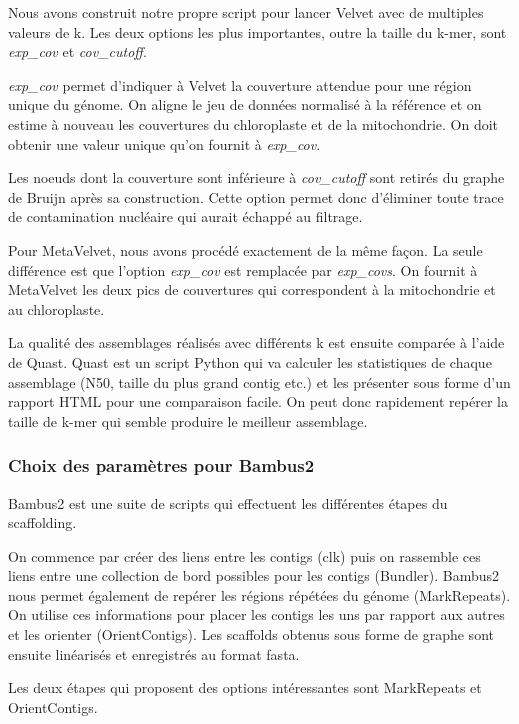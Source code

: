 \documentclass[a4paper]{article}
\begin{document}
Nous avons construit notre propre script pour lancer Velvet avec de multiples valeurs de k. Les deux options les plus importantes, outre la taille du k-mer, sont  \textit{exp\_cov} et \textit{cov\_cutoff}. 

\textit{exp\_cov} permet d'indiquer à Velvet la couverture attendue pour une région unique du génome. On aligne le jeu de données normalisé à la référence et on estime à nouveau les couvertures du chloroplaste et de la mitochondrie. On doit obtenir une valeur unique qu'on fournit à \textit{exp\_cov}. 

Les noeuds dont la couverture sont inférieure à \textit{cov\_cutoff} sont retirés du graphe de Bruijn après sa construction. Cette option permet donc d'éliminer toute trace de contamination nucléaire qui aurait échappé au filtrage.  

Pour MetaVelvet, nous avons procédé exactement de la même façon. La seule différence est que l'option \textit{exp\_cov} est remplacée par \textit{exp\_covs}. On fournit à MetaVelvet les deux pics de couvertures qui correspondent à la mitochondrie et au chloroplaste.

La qualité des assemblages réalisés avec différents k est ensuite comparée à l'aide de Quast. Quast est un script Python qui va calculer les statistiques de chaque assemblage (N50, taille du plus grand contig etc.) et les présenter sous forme d'un rapport HTML pour une comparaison facile. On peut donc rapidement repérer la taille de k-mer qui semble produire le meilleur assemblage.

\subsubsection{Choix des paramètres pour Bambus2}

Bambus2 est une suite de scripts qui effectuent les différentes étapes du scaffolding. 

On commence par créer des liens entre les contigs (clk) puis on rassemble ces liens entre une collection de bord possibles pour les contigs (Bundler). Bambus2 nous permet également de repérer les régions répétées du génome (MarkRepeats). On  utilise ces informations pour placer les contigs les uns par rapport aux autres et les orienter (OrientContigs). Les scaffolds obtenus sous forme de graphe sont ensuite linéarisés et enregistrés au format fasta.  

Les deux étapes qui proposent des options intéressantes sont MarkRepeats et OrientContigs. 
\end{document}
